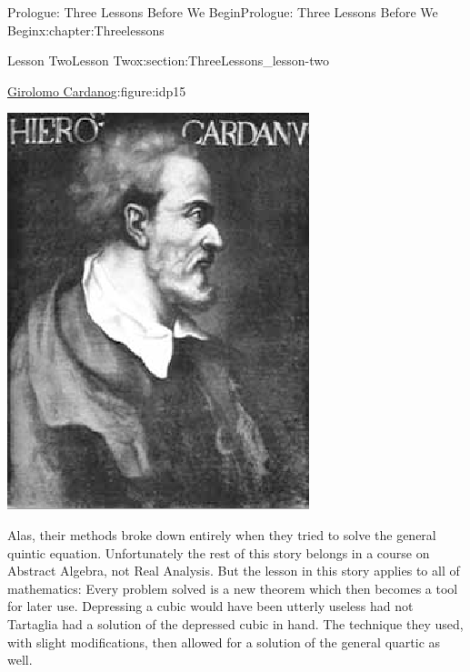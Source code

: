 \begin{chapterptx}{Prologue: Three Lessons Before We Begin}{}{Prologue: Three Lessons Before We Begin}{}{}{x:chapter:Threelessons}
\begin{sectionptx}{Lesson Two}{}{Lesson Two}{}{}{x:section:ThreeLessons_lesson-two}
\begin{figureptx}{\href{https://mathshistory.st-andrews.ac.uk/Biographies/Cardan}{Girolomo Cardano}\protect\footnotemark{}}{g:figure:idp15}{}
			\begin{image}{0.36}{0.28}{0.36}%
				\includegraphics[width=\linewidth]{external/images/Cardan.png}
			\end{image}%
			\tcblower
		\end{figureptx}%
		Alas, their methods broke down entirely when they tried to solve the general quintic equation.  Unfortunately the rest of this story belongs in a course on Abstract Algebra, not Real Analysis.  But the lesson in this story applies to all of mathematics: Every problem solved is a new theorem which then becomes a tool for later use.  Depressing a cubic would have been utterly useless had not Tartaglia had a solution of the depressed cubic in hand.  The technique they used, with slight modifications, then allowed for a solution of the general quartic as well.%
		\par

\end{sectionptx}
\end{chapterptx}
